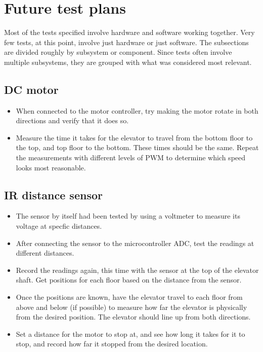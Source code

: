\documentclass{article}
\begin{document}
	
	\section{Future test plans}
	Most of the tests specified involve hardware and software working together. Very few tests, at this point, involve just hardware or just software. The subsections are divided roughly by subsystem or component. Since tests often involve multiple subsystems, they are grouped with what was considered most relevant.
	    \subsection{DC motor}
	    \begin{itemize}
            \item When connected to the motor controller, try making the motor rotate in both directions and verify that it does so.
            \item Measure the time it takes for the elevator to travel from the bottom floor to the top, and top floor to the bottom. These times should be the same. Repeat the measurements with different levels of PWM to determine which speed looks most reasonable.
        \end{itemize}
        
	    \subsection{IR distance sensor}
	    \begin{itemize}
	        \item The sensor by itself had been tested by using a voltmeter to measure its voltage at specfic distances.
	        \item After connecting the sensor to the microcontroller ADC, test the readings at different distances.
	        \item Record the readings again, this time with the sensor at the top of the elevator shaft. Get positions for each floor based on the distance from the sensor.
	        \item Once the positions are known, have the elevator travel to each floor from above and below (if possible) to measure how far the elevator is physically from the desired position. The elevator should line up from both directions.
	        \item Set a distance for the motor to stop at, and see how long it takes for it to stop, and record how far it stopped from the desired location.
	    \end{itemize}
	    
\end{document}
